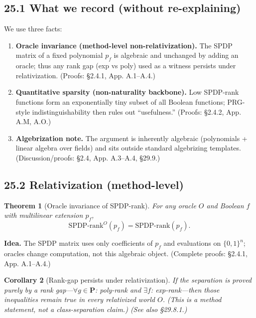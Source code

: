 \documentclass[12pt]{article}
\newtheorem{theorem}{Theorem}
\newtheorem{corollary}[theorem]{Corollary}
\theoremstyle{definition}
\theoremstyle{definition}
\theoremstyle{remark}
\theoremstyle{remark}
\begin{document}
\subsection{25.1 What we record (without re-explaining)}

We use three facts:

\begin{enumerate}
\item \textbf{Oracle invariance (method-level non-relativization).} The SPDP matrix of a fixed polynomial $p_f$ is algebraic and unchanged by adding an oracle; thus any rank gap (exp vs poly) used as a witness persists under relativization. (Proofs: \S2.4.1, App. A.1--A.4.)

\item \textbf{Quantitative sparsity (non-naturality backbone).} Low SPDP-rank functions form an exponentially tiny subset of all Boolean functions; PRG-style indistinguishability then rules out ``usefulness.'' (Proofs: \S2.4.2, App. A.M, A.O.)

\item \textbf{Algebrization note.} The argument is inherently algebraic (polynomials + linear algebra over fields) and sits outside standard algebrizing templates. (Discussion/proofs: \S2.4, App. A.3--A.4, \S29.9.)
\end{enumerate}

\subsection{25.2 Relativization (method-level)}

\begin{theorem}[Oracle invariance of SPDP-rank]\label{thm:oracle-invariance-appg}
For any oracle $O$ and Boolean $f$ with multilinear extension $p_f$,
\[
\text{SPDP-rank}^O(p_f) = \text{SPDP-rank}(p_f).
\]
\end{theorem}

\textbf{Idea.} The SPDP matrix uses only coefficients of $p_f$ and evaluations on $\{0,1\}^n$; oracles change computation, not this algebraic object. (Complete proofs: \S2.4.1, App. A.1--A.4.)

\begin{corollary}[Rank-gap persists under relativization]\label{cor:rank-gap-persists}
If the separation is proved purely by a rank gap---$\forall g \in \mathbf{P}$: poly-rank and $\exists f$: exp-rank---then those inequalities remain true in every relativized world $O$. (This is a method statement, not a class-separation claim.) (See also \S29.8.1.)
\end{corollary}
\end{document}
